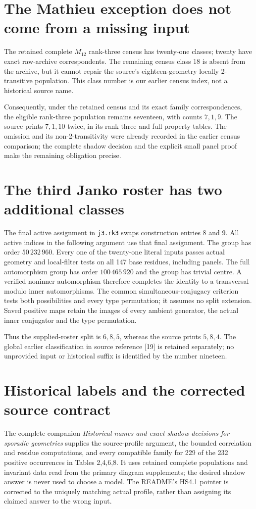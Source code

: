 \documentclass[11pt,a4paper]{article}
\begin{document}
\section{The Mathieu exception does not come from a missing input}
The retained complete $M_{12}$ rank-three census has twenty-one classes;
twenty have exact raw-archive correspondents. The remaining census
class 18 is absent from the archive, but it cannot repair the source's
eighteen-geometry locally 2-transitive population. This class number is
our earlier census index, not a historical source name.

Consequently, under the retained census and its exact family
correspondences, the eligible rank-three population remains seventeen,
with counts $7,1,9$. The source prints $7,1,10$ twice, in its rank-three
and full-property tables. The omission and its non-2-transitivity were
already recorded in the earlier census comparison; the complete shadow
decision and the explicit small panel proof make the remaining
obligation precise.

\section{The third Janko roster has two additional classes}
The final active assignment in \texttt{j3.rk3} swaps construction entries
8 and 9. All active indices in the following argument use that final
assignment. The group has order $50\,232\,960$. Every one of the
twenty-one literal inputs passes actual geometry and local-filter tests
on all 147 base residues, including panels. The full automorphism group
has order $100\,465\,920$ and the group has trivial centre. A verified
noninner automorphism therefore completes the identity to a transversal
modulo inner automorphisms. The common simultaneous-conjugacy criterion
tests both possibilities and every type permutation; it assumes no
split extension. Saved positive maps retain the images of every ambient
generator, the actual inner conjugator and the type permutation.

Thus the supplied-roster split is $6,8,5$, whereas the source prints
$5,8,4$. The global earlier classification in source reference [19]
is retained separately; no unprovided input or historical suffix is
identified by the number nineteen.

\section{Historical labels and the corrected source contract}
The complete companion \emph{Historical names and exact shadow decisions
for sporadic geometries} supplies the source-profile argument, the bounded
correlation and residue computations, and every compatible family for
229 of the 232 positive occurrences in Tables 2,4,6,8. It uses retained
complete populations and invariant data read from the primary diagram
supplements; the desired shadow answer is never used to choose a model.
The README's HS4.1 pointer is corrected to the uniquely matching actual
profile, rather than assigning its claimed answer to the wrong input.
\end{document}
